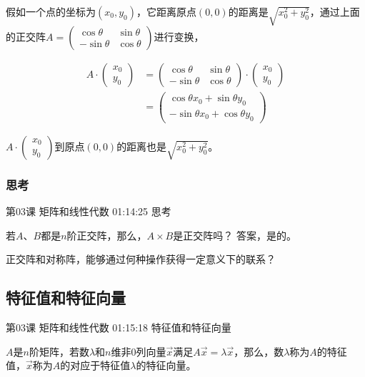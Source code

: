 \documentclass[UTF8]{ctexart}
\begin{document}
假如一个点的坐标为$(x_{0},y_{0})$，它距离原点$(0,0)$的距离是$\sqrt{x_{0}^{2}+y_{0}^{2}}$，通过上面的正交阵$A=\begin{pmatrix} \cos \theta & \sin \theta \\ -\sin \theta & \cos \theta \end{pmatrix}$进行变换，

\begin{equation}
\begin{aligned}
A \cdot \begin{pmatrix} x_{0} \\ y_{0} \end{pmatrix}
&= \begin{pmatrix} \cos \theta & \sin \theta \\ -\sin \theta & \cos \theta \end{pmatrix} \cdot
\begin{pmatrix} x_{0} \\ y_{0} \end{pmatrix} \\
&=
\begin{pmatrix}
\cos \theta x_{0} + \sin \theta y_{0} \\
-\sin \theta x_{0} + \cos \theta y_{0}
\end{pmatrix}
\end{aligned}
\end{equation}

$A \cdot \begin{pmatrix} x_{0} \\ y_{0} \end{pmatrix}$到原点$(0,0)$的距离也是$\sqrt{x_{0}^{2}+y_{0}^{2}}$。

\subsubsection{思考}

第03课 矩阵和线性代数 01:14:25 思考

若$A$、$B$都是$n$阶正交阵，那么，$A \times B$是正交阵吗？ 答案，是的。

正交阵和对称阵，能够通过何种操作获得一定意义下的联系？

\subsection{特征值和特征向量}

第03课 矩阵和线性代数 01:15:18 特征值和特征向量

$A$是$n$阶矩阵，若数$\lambda$和$n$维非$0$列向量$\vec{x}$满足$A\vec{x}=\lambda \vec{x}$，那么，数$\lambda$称为$A$的特征值，$\vec{x}$称为$A$的对应于特征值$\lambda$的特征向量。
\end{document}
